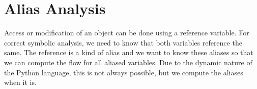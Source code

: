 \section{Alias Analysis}
Access or modification of an object can be done using a reference variable. For correct symbolic analysis, we need to know that both variables reference the same. The reference is a kind of alias and we want to know these aliases so that we can compute the flow for all aliased variables. Due to the dynamic nature of the Python language, this is not always possible, but we compute the aliases when it is.